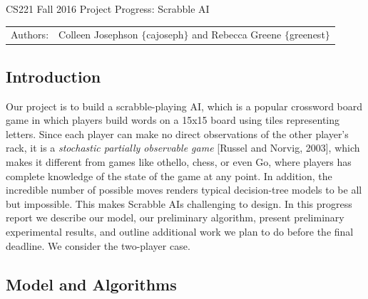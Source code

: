 \documentclass[12pt]{article}
\begin{document}
\begin{center}
{\Large CS221 Fall 2016 Project Progress: Scrabble AI}

\begin{tabular}{rl}
  Authors: & Colleen Josephson $\{$cajoseph$\}$ and Rebecca Greene $\{$greenest$\}$\\
\end{tabular}
\end{center}

\subsection*{Introduction}
Our project is to build a scrabble-playing AI, which is a popular
crossword board game in which players build words on a 15x15 board
using tiles representing letters. Since each player can make no direct
observations of the other player's rack, it is a \emph{stochastic
  partially observable game} [Russel and Norvig, 2003], which makes it
different from games like othello, chess, or even Go, where players
has complete knowledge of the state of the game at any point. In
addition, the incredible number of possible moves renders typical
decision-tree models to be all but impossible. This makes Scrabble AIs
challenging to design. In this progress report we describe our model,
our preliminary algorithm, present preliminary experimental results,
and outline additional work we plan to do before the final
deadline. We consider the two-player case.


\subsection*{Model and Algorithms}
\end{document}
